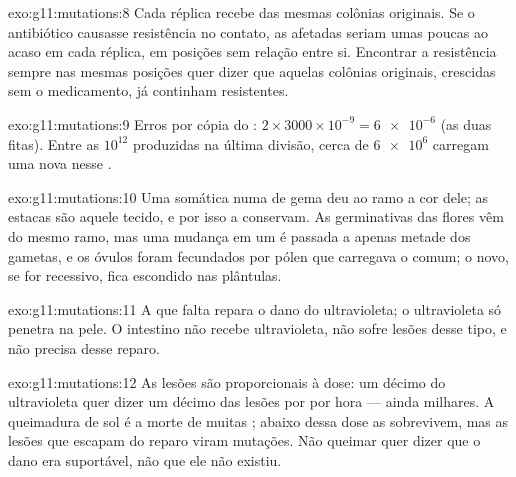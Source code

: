\begin{solution}{exo:g11:mutations:8}
Cada réplica recebe  das mesmas colônias originais. Se o
antibiótico causasse resistência no contato, as  afetadas seriam
umas poucas ao acaso em cada réplica, em posições sem relação entre si.
Encontrar a resistência sempre nas mesmas posições quer dizer que
aquelas colônias originais, crescidas sem o medicamento, já continham
 resistentes.
\end{solution}

\begin{solution}{exo:g11:mutations:9}
Erros por cópia do : $2 \times 3000 \times 10^{-9} =
\num{6e-6}$ (as duas fitas). Entre as $10^{12}$  produzidas na
última divisão, cerca de $\num{6e6}$ carregam uma  nova nesse .
\end{solution}

\begin{solution}{exo:g11:mutations:10}
Uma  somática numa  de gema deu ao ramo a cor dele; as
estacas são aquele tecido, e por isso a conservam. As 
germinativas das flores vêm do mesmo ramo, mas uma mudança em um 
é passada a apenas metade dos gametas, e os óvulos foram fecundados por
pólen que carregava o  comum; o  novo, se for recessivo, fica
escondido nas plântulas.
\end{solution}

\begin{solution}{exo:g11:mutations:11}
A  que falta repara o dano do ultravioleta; o ultravioleta só
penetra na pele. O intestino não recebe ultravioleta, não sofre lesões
desse tipo, e não precisa desse reparo.
\end{solution}

\begin{solution}{exo:g11:mutations:12}
As lesões são proporcionais à dose: um décimo do ultravioleta quer
dizer um décimo das lesões por  por hora --- ainda milhares. A
queimadura de sol é a morte de muitas ; abaixo dessa dose as
 sobrevivem, mas as lesões que escapam do reparo viram mutações.
Não queimar quer dizer que o dano era suportável, não que ele não
existiu.
\end{solution}

